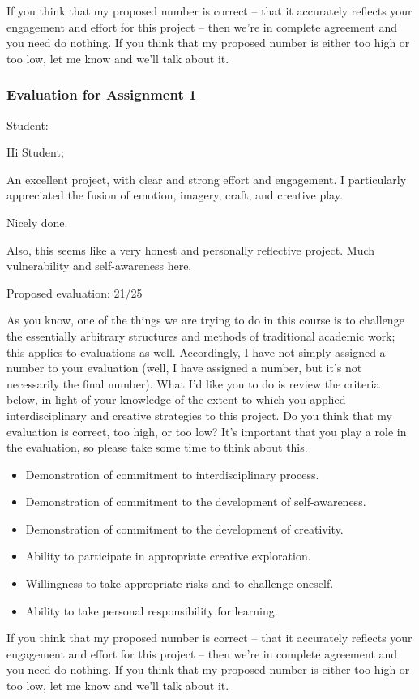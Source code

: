 \documentclass[letterpaper,10pt,DIV=9,headsepline]{scrreprt}
\begin{document}
If you think that my proposed number is correct -- that it accurately
reflects your engagement and effort for this project -- then we're in
complete agreement and you need do nothing. If you think that my
proposed number is either too high or too low, let me know and we'll
talk about it.

\newpage

\subsubsection{Evaluation for Assignment 1}

Student: 

\bigskip
Hi Student;

An excellent project, with clear and strong effort and engagement. I
particularly appreciated the fusion of emotion, imagery, craft, and
creative play.

Nicely done.

Also, this seems like a very honest and personally reflective project.
Much vulnerability and self-awareness here.



\bigskip
Proposed evaluation: 21/25

\bigskip
As you know, one of the things we are trying to do in this course is
to challenge the essentially arbitrary structures and methods of
traditional academic work; this applies to evaluations as well.
Accordingly, I have not simply assigned a number to your evaluation
(well, I have assigned a number, but it's not necessarily the final
number). What I'd like you to do is review the criteria below, in
light of your knowledge of the extent to which you applied
interdisciplinary and creative strategies to this project. Do you
think that my evaluation is correct, too high, or too low? It's
important that you play a role in the evaluation, so please take some
time to think about this.

\begin{itemize}
\item Demonstration of commitment to interdisciplinary process.
\item Demonstration of commitment to the development of self-awareness.
\item Demonstration of commitment to the development of creativity.
\item Ability to participate in appropriate creative exploration.
\item Willingness to take appropriate risks and to challenge oneself.
\item Ability to take personal responsibility for learning.
\end{itemize}

If you think that my proposed number is correct -- that it accurately
reflects your engagement and effort for this project -- then we're in
complete agreement and you need do nothing. If you think that my
proposed number is either too high or too low, let me know and we'll
talk about it.

\newpage
\end{document}
